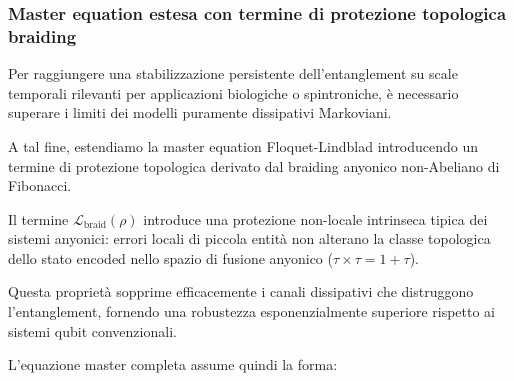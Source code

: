 \documentclass[11pt,a4paper]{article}
\theoremstyle{plain}
\theoremstyle{definition}
\begin{document}
\vspace{0.7cm}



\subsubsection{Master equation estesa con termine di protezione topologica braiding}

\vspace{0.2cm}

Per raggiungere una stabilizzazione persistente dell'entanglement su scale temporali rilevanti per applicazioni biologiche o spintroniche, è necessario superare i limiti dei modelli puramente dissipativi Markoviani. 


\vspace{0.2cm}


A tal fine, estendiamo la master equation Floquet-Lindblad introducendo un termine di protezione topologica derivato dal braiding anyonico non-Abeliano di Fibonacci.


\vspace{0.3cm}



Il termine $\mathcal{L}_{\text{braid}}(\rho)$ introduce una protezione non-locale intrinseca tipica dei sistemi anyonici: errori locali di piccola entità non alterano la classe topologica dello stato encoded nello spazio di fusione anyonico ($\tau \times \tau = 1 + \tau$). 


\vspace{0.2cm}


Questa proprietà sopprime efficacemente i canali dissipativi che distruggono l'entanglement, fornendo una robustezza esponenzialmente superiore rispetto ai sistemi qubit convenzionali.



\vspace{0.3cm}

L'equazione master completa assume quindi la forma:
\end{document}
